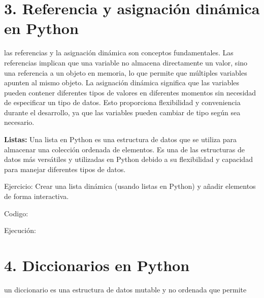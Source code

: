 \documentclass[a4paper]{article}
\begin{document}
\section{3. Referencia y asignación dinámica en Python}
{
las referencias y la asignación dinámica son conceptos fundamentales. Las referencias implican que una variable no
almacena directamente un valor, sino una referencia a un objeto en memoria, lo que permite que múltiples variables
apunten al mismo objeto. La asignación dinámica significa que las variables pueden contener diferentes tipos de valores
en diferentes momentos sin necesidad de especificar un tipo de datos. Esto proporciona flexibilidad y conveniencia
durante el desarrollo, ya que las variables pueden cambiar de tipo según sea necesario.}


\bigskip

{
\textbf{Listas: }Una lista en Python es una estructura de datos que se utiliza para almacenar una colección ordenada de
elementos. Es una de las estructuras de datos más versátiles y utilizadas en Python debido a su flexibilidad y
capacidad para manejar diferentes tipos de datos.}


\bigskip

{
Ejercicio: Crear una lista dinámica (usando listas en Python) y añadir elementos de forma interactiva.}

\pagestyle{Convertedii}



{
Codigo:}


\bigskip

{
Ejecución:}

\begin{center}
\end{center}

\clearpage

\section{4. Diccionarios en Python}

\bigskip

{
un diccionario es una estructura de datos mutable y no ordenada que permite}
\end{document}
